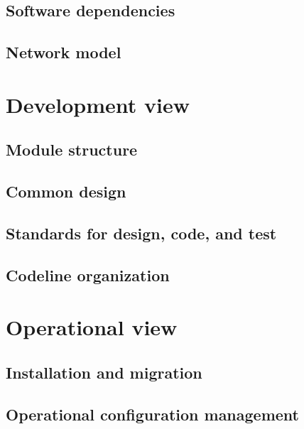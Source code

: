 \documentclass[a4paper,11pt]{report}
\begin{document}
\subsection{Software dependencies}
\label{sec:softw-depend}


\subsection{Network model}
\label{sec:network-model}


\section{Development view}
\label{sec:development-view}


\subsection{Module structure}
\label{sec:module-structure}


\subsection{Common design}
\label{sec:common-design}


\subsection{Standards for design, code, and test}
\label{sec:stand-design-code}


\subsection{Codeline organization}
\label{sec:codel-organ}


\section{Operational view}
\label{sec:operational-view}

\subsection{Installation and migration}
\label{sec:inst-migr}


\subsection{Operational configuration management}
\label{sec:oper-conf-manag}
\end{document}
